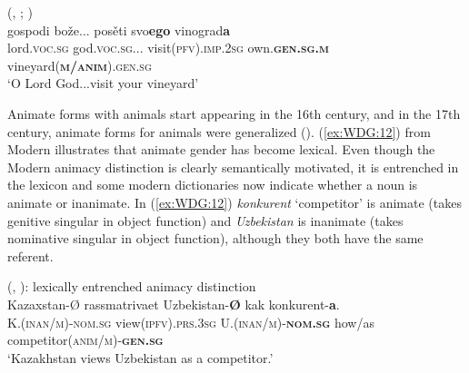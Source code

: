 \documentclass[output=collectionpaper]{langsci/langscibook}
\begin{document}
\ea\label{ex:WDG:11}
 (, ; \citealt[267]{Dietze1973})\\
\gll gospodi	bože...	posěti	svo\textbf{ego}	vinograd\textbf{a}\\
lord.\textsc{voc.sg}	god.\textsc{voc.sg}...	visit(\textsc{pfv}).\textsc{imp.2sg}	own.\textbf{\textsc{gen.sg.m}}	vineyard(\textbf{\textsc{m/anim}}).\textsc{gen.sg}\\
\glt `O Lord God...visit your vineyard'\\
\z

Animate forms with animals start appearing in the 16th century, and in the 17th century, animate forms for animals were generalized (\citealt[270]{Dietze1973}). (\ref{ex:WDG:12}) from Modern  illustrates that animate gender has become lexical. Even though the Modern  animacy distinction is clearly semantically motivated, it is entrenched in the lexicon and some modern dictionaries now indicate whether a noun is animate or inanimate. In (\ref{ex:WDG:12}) \textit{konkurent} `competitor' is animate (takes genitive singular in object function) and \textit{Uzbekistan} is inanimate (takes nominative singular in object function), although they both have the same referent.

\ea\label{ex:WDG:12}
 (, ): lexically entrenched animacy distinction\\
\gll Kazaxstan-Ø	rassmatrivaet	Uzbekistan-\textbf{Ø}	kak	konkurent-\textbf{a}.\\
K.(\textsc{inan/m)-nom.sg}	view(\textsc{ipfv}).\textsc{prs.3sg}	U.(\textsc{inan/m})-\textbf{\textsc{nom.sg}}	how/as	competitor(\textsc{anim/m})-\textbf{\textsc{gen.sg}}\\
\glt `Kazakhstan views Uzbekistan as a competitor.'\\
\z
\end{document}
